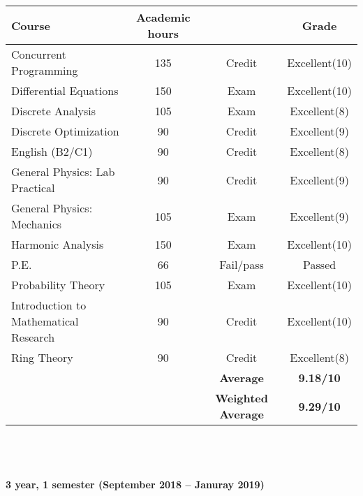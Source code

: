 \documentclass[11pt, a4paper]{report}
\newcommand{\upperRomannumeral}[1]{\uppercase\expandafter{\romannumeral#1}}
\begin{document}
\begin{tabular}{|p{6cm}|c|c|c|}
\hline
\rowcolor{LightCyan}
\textbf{Course}&\textbf{Academic hours}&&\textbf{Grade}\\
\hline
Concurrent Programming & 135 & Credit & Excellent(10)\\
Differential Equations \upperRomannumeral{2} & 150 & Exam & Excellent(10)\\
Discrete Analysis \upperRomannumeral{2} & 105 & Exam & Excellent(8)\\
Discrete Optimization & 90 & Credit & Excellent(9)\\
English (B2/C1) & 90 & Credit & Excellent(8)\\
General Physics: Lab Practical & 90 & Credit & Excellent(9)\\
General Physics: Mechanics & 105 & Exam & Excellent(9)\\
Harmonic Analysis & 150 & Exam & Excellent(10)\\
P.E. & 66 & Fail/pass & Passed \\Probability Theory & 105 & Exam & Excellent(10)\\
Introduction to Mathematical Research  & 90 & Credit & Excellent(10)\\
Ring Theory & 90 & Credit & Excellent(8)\\
\hline
\rowcolor{LightCyan}
&& \textbf{Average} & \textbf{9.18/10}\\
\rowcolor{LightCyan}
\hline
&& \textbf{Weighted Average} & \textbf{9.29/10}\\
\hline
\end{tabular}\\ \\
\\
\textbf{3 year, 1 semester (September 2018 -- Januray 2019)}\\ \\
\end{document}
